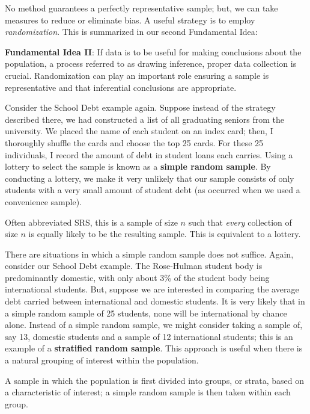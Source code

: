 \documentclass[]{book}
\theoremstyle{definition}
\theoremstyle{definition}
\theoremstyle{definition}
\theoremstyle{remark}
\let\BeginKnitrBlock\begin \let\EndKnitrBlock\end
\begin{document}
No method guarantees a perfectly representative sample; but, we can take
measures to reduce or eliminate bias. A useful strategy is to employ
\emph{randomization}. This is summarized in our second Fundamental Idea:

\BeginKnitrBlock{rmdfivefund}
\textbf{Fundamental Idea II}: If data is to be useful for making
conclusions about the population, a process referred to as drawing
inference, proper data collection is crucial. Randomization can play an
important role ensuring a sample is representative and that inferential
conclusions are appropriate.
\EndKnitrBlock{rmdfivefund}

Consider the School Debt example again. Suppose instead of the strategy
described there, we had constructed a list of all graduating seniors
from the university. We placed the name of each student on an index
card; then, I thoroughly shuffle the cards and choose the top 25 cards.
For these 25 individuals, I record the amount of debt in student loans
each carries. Using a lottery to select the sample is known as a
\textbf{simple random sample}. By conducting a lottery, we make it very
unlikely that our sample consists of only students with a very small
amount of student debt (as occurred when we used a convenience sample).

\BeginKnitrBlock{definition}[Simple Random Sample]
\protect\hypertarget{def:defn-simple-random-sample}{}{\label{def:defn-simple-random-sample}
{} }Often abbreviated SRS, this is a
sample of size \(n\) such that \emph{every} collection of size \(n\) is
equally likely to be the resulting sample. This is equivalent to a
lottery.
\EndKnitrBlock{definition}

There are situations in which a simple random sample does not suffice.
Again, consider our School Debt example. The Rose-Hulman student body is
predominantly domestic, with only about 3\% of the student body being
international students. But, suppose we are interested in comparing the
average debt carried between international and domestic students. It is
very likely that in a simple random sample of 25 students, none will be
international by chance alone. Instead of a simple random sample, we
might consider taking a sample of, say 13, domestic students and a
sample of 12 international students; this is an example of a
\textbf{stratified random sample}. This approach is useful when there is
a natural grouping of interest within the population.

\BeginKnitrBlock{definition}[Stratified Random Sample]
\protect\hypertarget{def:defn-stratified-random-sample}{}{\label{def:defn-stratified-random-sample}
{} }A sample in which the
population is first divided into groups, or strata, based on a
characteristic of interest; a simple random sample is then taken within
each group.
\EndKnitrBlock{definition}
\end{document}
